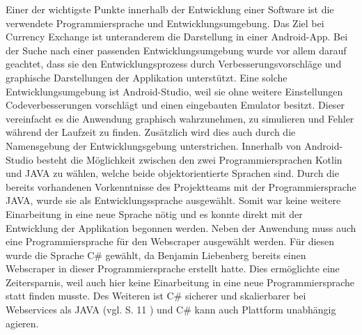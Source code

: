 \documentclass[conference]{IEEEtran}
\begin{document}
Einer der wichtigste Punkte innerhalb der Entwicklung einer Software ist die verwendete Programmiersprache und Entwicklungsumgebung. Das Ziel bei Currency Exchange ist unteranderem die Darstellung in einer Android-App. Bei der Suche nach einer passenden Entwicklungsumgebung wurde vor allem darauf geachtet, dass sie den Entwicklungsprozess durch Verbesserungsvorschläge und graphische Darstellungen der Applikation unterstützt. Eine solche Entwicklungsumgebung ist Android-Studio, weil sie ohne weitere Einstellungen Codeverbesserungen vorschlägt und einen eingebauten Emulator besitzt. Dieser vereinfacht es die Anwendung graphisch wahrzunehmen, zu simulieren und Fehler während der Laufzeit zu finden. Zusätzlich wird dies auch durch die Namensgebung der Entwicklungsgebung unterstrichen. Innerhalb von Android-Studio besteht die Möglichkeit zwischen den zwei Programmiersprachen Kotlin und JAVA zu wählen, welche beide objektorientierte Sprachen sind. Durch die bereits vorhandenen Vorkenntnisse des Projektteams mit der Programmiersprache JAVA, wurde sie als Entwicklungssprache ausgewählt. Somit war keine weitere Einarbeitung in eine neue Sprache nötig und es konnte direkt mit der Entwicklung der Applikation begonnen werden. Neben der Anwendung muss auch eine Programmiersprache für den Webscraper ausgewählt werden. Für diesen wurde die Sprache C\# gewählt, da Benjamin Liebenberg bereits einen Webscraper in dieser Programmiersprache erstellt hatte. Dies ermöglichte eine Zeitersparnis, weil auch hier keine Einarbeitung in eine neue Programmiersprache statt finden musste. Des Weiteren ist C\# sicherer und skalierbarer bei Webservices als JAVA (vgl. S. 11 \cite{csharpperformance}) und C\# kann auch Plattform unabhängig agieren.
\end{document}
